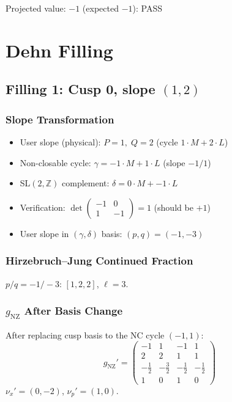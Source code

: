 \documentclass[11pt,a4paper]{article}
\newcommand{\passmark}{\textcolor{pass}{PASS}}
\begin{document}
Projected value: $-1$ (expected $-1$): \passmark

\section{Dehn Filling}

\subsection{Filling 1: Cusp 0, slope $(1, 2)$}

\subsubsection{Slope Transformation}
\begin{itemize}
  \item User slope (physical): $P = 1,\; Q = 2$ (cycle $1 \cdot M + 2 \cdot L$)
  \item Non-closable cycle: $\gamma = -1 \cdot M + 1 \cdot L$ (slope $-1/1$)
  \item SL$(2,\mathbb{Z})$ complement: $\delta = 0 \cdot M + -1 \cdot L$
  \item Verification: $\det \begin{pmatrix} -1 & 0 \\ 1 & -1 \end{pmatrix} = 1$ (should be $+1$)
  \item User slope in $(\gamma, \delta)$ basis: $(p, q) = (-1, -3)$
\end{itemize}

\subsubsection{Hirzebruch--Jung Continued Fraction}
$p/q = -1/-3$: $[1, 2, 2]$, $\ell = 3$.

\subsubsection{$g_{\text{NZ}}$ After Basis Change}
After replacing cusp basis to the NC cycle $(-1, 1)$:
{\small
\[
g_{\text{NZ}}' = \begin{pmatrix}
-1 & 1 & -1 & 1 \\
2 & 2 & 1 & 1 \\
-\tfrac{1}{2} & -\tfrac{3}{2} & -\tfrac{1}{2} & -\tfrac{1}{2} \\
1 & 0 & 1 & 0
\end{pmatrix}
\]
}
$\nu_x' = (0, -2)$, $\nu_p' = (1, 0)$.
\end{document}
